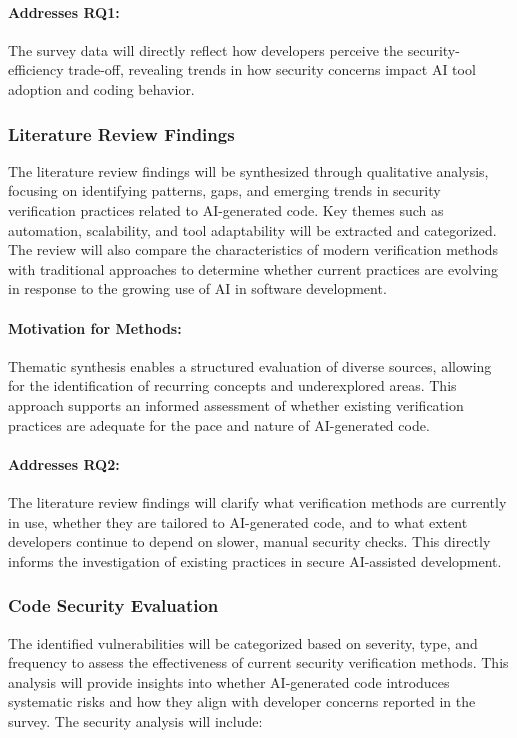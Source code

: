 \paragraph{Addresses RQ1:} The survey data will directly reflect how developers perceive the security-efficiency trade-off, revealing trends in how security concerns impact AI tool adoption and coding behavior.

\subsubsection{Literature Review Findings}
The literature review findings will be synthesized through qualitative analysis, focusing on identifying patterns, gaps, and emerging trends in security verification practices related to AI-generated code. Key themes such as automation, scalability, and tool adaptability will be extracted and categorized. The review will also compare the characteristics of modern verification methods with traditional approaches to determine whether current practices are evolving in response to the growing use of AI in software development.
\paragraph{Motivation for Methods:} Thematic synthesis enables a structured evaluation of diverse sources, allowing for the identification of recurring concepts and underexplored areas. This approach supports an informed assessment of whether existing verification practices are adequate for the pace and nature of AI-generated code.
\paragraph{Addresses RQ2:} The literature review findings will clarify what verification methods are currently in use, whether they are tailored to AI-generated code, and to what extent developers continue to depend on slower, manual security checks. This directly informs the investigation of existing practices in secure AI-assisted development.

\subsubsection{Code Security Evaluation}
The identified vulnerabilities will be categorized based on severity, type, and frequency to assess the effectiveness of current security verification methods. This analysis will provide insights into whether AI-generated code introduces systematic risks and how they align with developer concerns reported in the survey.
The security analysis will include:

